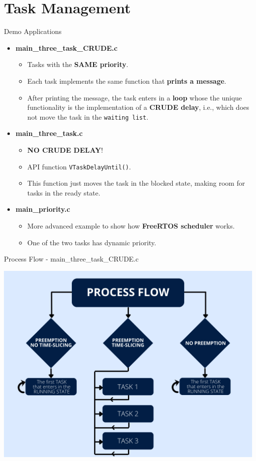 \documentclass{beamer}
\begin{document}
\section{Task Management}
\begin{frame}{Demo Applications}
    \begin{itemize}
        \item \textbf{main\_three\_task\_CRUDE.c}
        \begin{itemize}
            \item Tasks with the \textbf{SAME priority}.
            \item Each task implements the same function that \textbf{prints a message}.
            \item After printing the message, the task enters in a \textbf{loop} whose the unique functionality is the implementation of a \textbf{CRUDE delay}, i.e., which does not move the task in the \texttt{waiting list}.
        \end{itemize}
        \item \textbf{main\_three\_task.c}
        \begin{itemize}
            \item \textbf{NO CRUDE DELAY}!
            \item API function \texttt{VTaskDelayUntil()}.
            \item This function just moves the task in the blocked state, making room for tasks in the ready state.
        \end{itemize}
        \item \textbf{main\_priority.c}
        \begin{itemize}
            \item More advanced example to show how \textbf{FreeRTOS scheduler} works.
            \item One of the two tasks has dynamic priority.
        \end{itemize}
    \end{itemize}
\end{frame}

\begin{frame}{Process Flow - main\_three\_task\_CRUDE.c}

\vfill
\centering
\includegraphics[width=0.65\linewidth]{img/three_tasks_CRUDE.png} 
\vfill
    
\end{frame}
\end{document}
